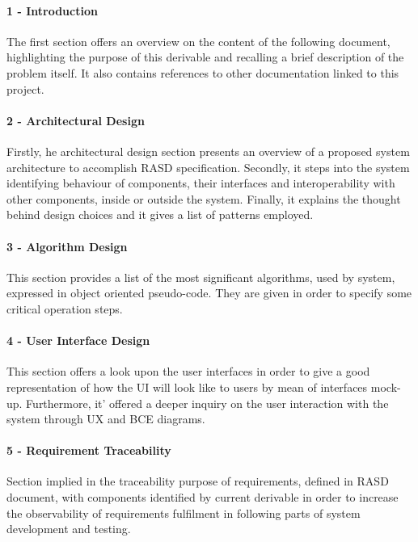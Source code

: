 	\paragraph*{1 - Introduction} 
	The first section offers an overview on the content of the following document, highlighting the purpose of this derivable and recalling a brief description of the problem itself. It also contains references to other documentation linked to this project.

	\paragraph*{2 - Architectural Design} 
	Firstly, he architectural design section presents an overview of a proposed system architecture to accomplish RASD specification. 
	\newline
	Secondly, it steps into the system identifying behaviour of components, their interfaces and interoperability with other components, inside or outside the system. 
	\newline
	Finally, it explains the thought behind design choices and it gives a list of patterns employed.

	\paragraph*{3 - Algorithm Design}
	This section provides a list of the most significant algorithms, used by system, expressed in object oriented pseudo-code. They are given in order to specify some critical operation steps.

	\paragraph*{4 - User Interface Design}
	This section offers a look upon the user interfaces in order to give a good representation of how the UI will look like to users by mean of interfaces mock-up. Furthermore, it' offered a deeper inquiry on the user interaction with the system through UX and BCE diagrams.

	\paragraph*{5 - Requirement Traceability}
	Section implied in the traceability purpose of requirements, defined in RASD document, with components identified by current derivable in order to increase the observability of requirements fulfilment in following parts of system development and testing.

